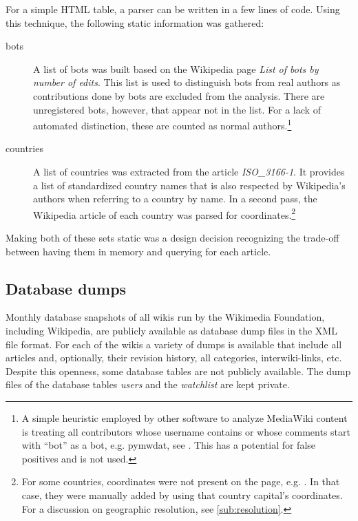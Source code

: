 For a simple HTML table, a parser can be written in a few lines of code.
Using this technique, the following static information was gathered:

\begin{description}
\item[bots] A list of bots was built based on the Wikipedia page \emph{List of bots by number of edits}. 
This list is used to distinguish bots from real authors as contributions done by bots are excluded from the analysis.
There are unregistered bots, however, that appear not in the list.
For a lack of automated distinction, these are counted as normal authors.\footnote{A simple heuristic employed by other software to analyze MediaWiki content is treating all contributors whose username contains or whose comments start with ``bot'' as a bot, e.g. pymwdat, see . This has a potential for false positives and is not used.}
\item[countries] A list of countries was extracted from the article \emph{ISO\_3166-1}. 
It provides a list of standardized country names that is also respected by Wikipedia's authors when referring to a country by name.
In a second pass, the Wikipedia article of each country was parsed for coordinates.\footnote{For some countries, coordinates were not present on the page, e.g. . In that case, they were manually added by using that country capital's coordinates. For a discussion on geographic resolution, see \ref{sub:resolution}.}
\end{description}

Making both of these sets static was a design decision recognizing the trade-off between having them in memory and querying for each article.

\subsection{Database dumps}

Monthly database snapshots of all wikis run by the Wikimedia Foundation, including Wikipedia,  are publicly available as database dump files in the XML file format.
For each of the wikis a variety of dumps is available that include all articles and, optionally, their revision history, all categories, interwiki-links, etc.
Despite this openness, some database tables are not publicly available.
The dump files of the database tables \emph{users} and the \emph{watchlist} are kept private.

